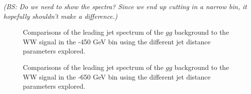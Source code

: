 \emph{(BS: Do we need to show the \pt spectra? Since we end up cutting in a narrow bin, it hopefully shouldn't make a difference.)}

\begin{figure}
\begin{center}
\caption{Comparisons of the leading jet \pt spectrum of the $gg$
  background to the WW signal in the -450 GeV bin using the
  different \antikt jet distance parameters explored.}
\label{fig:pt300_basics}
\end{center}
\end{figure}

\begin{figure}
\begin{center}
\caption{Comparisons of the leading jet \pt spectrum of the $gg$
  background to the WW signal in the -650 GeV bin using the
  different \antikt jet distance parameters explored.}
\label{fig:pt500_basics}
\end{center}
\end{figure}

